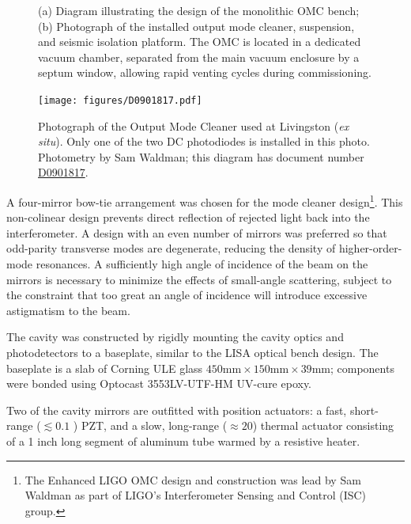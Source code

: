\begin{figure}[t]
\caption[OMC diagram and photograph of installation]{
  (a) Diagram illustrating the design of the monolithic OMC
  bench; (b) Photograph of the installed output mode cleaner,
  suspension, and seismic isolation platform. The OMC is located in a
  dedicated vacuum chamber, separated from the main vacuum enclosure
  by a septum window, allowing rapid venting cycles during
  commissioning.}
\end{figure}
\begin{figure}
\texttt{[image: figures/D0901817.pdf]}
\caption[Output Mode Cleaner photograph]{Photograph of the Output Mode
  Cleaner used at Livingston (\emph{ex situ}).  Only one of the two DC
  photodiodes is installed in this photo.  Photometry by Sam Waldman;
  this diagram has document number
  \href{https://dcc.ligo.org/cgi-bin/private/DocDB/ShowDocument?docid=4713}{D0901817}.
}
\end{figure}


A four-mirror bow-tie arrangement was chosen for the mode cleaner
design\footnote{The Enhanced LIGO OMC design and construction was lead by
  Sam Waldman as part of LIGO's Interferometer Sensing and Control (ISC)
  group.}.  This non-colinear design prevents direct reflection of
rejected light back into the interferometer.  A design with an even
number of mirrors was preferred so that odd-parity transverse modes
are degenerate, reducing the density of higher-order-mode resonances.
A sufficiently high angle of incidence of the beam on the mirrors is
necessary to minimize the effects of small-angle scattering, subject
to the constraint that too great an angle of incidence will introduce
excessive astigmatism to the beam.

The cavity was constructed by rigidly mounting the cavity optics and
photodetectors to a baseplate, similar to the LISA optical bench
design.  The baseplate is a slab of Corning ULE glass $450 \mathrm{mm}
\times 150 \mathrm{mm} \times \mathrm{39}\mathrm{mm}$; components were
bonded using Optocast {\sffamily 3553LV-UTF-HM} UV-cure epoxy.

Two of the cavity mirrors are outfitted with position actuators: a
fast, short-range ($\lesssim0.1$ \micron) PZT, and a slow, long-range
($\approx 20$\micron) thermal actuator consisting of a 1 inch long segment
of aluminum tube warmed by a resistive heater.

